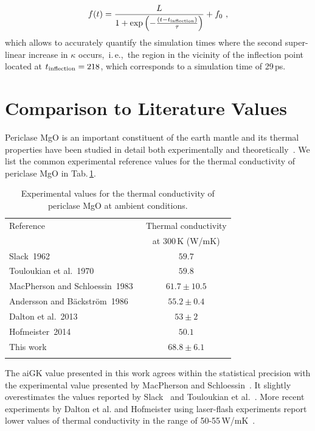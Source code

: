 \begin{align}
	f(t) 
		= \frac{L}{1 + \exp \left(-\frac{(t-t_{\rm inflection})}{\tau} \right)} + f_0~,
	\label{eq:imp.f_logistic}
\end{align}
which allows to accurately quantify the simulation times where the second super-linear increase in $\kappa$ occurs,~i.\,e.,~the region in the vicinity of the inflection point located at $t_{\rm inflection} = 218$, which corresponds to a simulation time of 29\,ps.

\section{Comparison to Literature Values}
Periclase MgO is an important constituent of the earth mantle and its thermal properties have been studied in detail both experimentally and theoretically~\cite{charvat1957,slack1962,touloukian1970,Macpherson1983,Koker2009,Stackhouse2010,tang2010,dekura2017}. We list the common experimental reference values for the thermal conductivity of periclase MgO in Tab.\,\ref{tab:exp.MgO}.
\begin{table}[ht]
  \centering
  \selectfont
  \begin{tabular}{lc}
    \toprule
    Reference & Thermal conductivity \\
    & at 300\,K (W/mK) \\
    \midrule
    Slack~1962~\cite{slack1962} & $59.7$ \\
    Touloukian et al.~1970~\cite{touloukian1970} & $59.8$ \\
    MacPherson and Schloessin~1983~\cite{Macpherson1983} & $61.7 \pm 10.5$ \\
    Andersson and B\"ackstr\"om~1986~\cite{andersson1986} & $55.2 \pm 0.4$ \\
    Dalton et al.~2013~\cite{dalton2013} & $53 \pm 2$ \\
    Hofmeister~2014~\cite{hofmeister2014} & $50.1$ \\
    This work & $68.8 \pm 6.1$ \\
    \bottomrule
    \vspace{.5em}
  \end{tabular}
  \caption{Experimental values for the thermal conductivity of periclase MgO at ambient conditions. %
  }
  \label{tab:exp.MgO}
\end{table}
The aiGK value presented in this work agrees within the statistical precision with the experimental value presented by MacPherson and Schloessin~\cite{Macpherson1983}. It slightly overestimates the values reported by Slack~\cite{slack1962} and Touloukian et al.~\cite{touloukian1970}. More recent experiments by Dalton et al. and Hofmeister using laser-flash experiments report lower values of thermal conductivity in the range of 50-55\,W/mK~\cite{dalton2013,hofmeister2014}.

